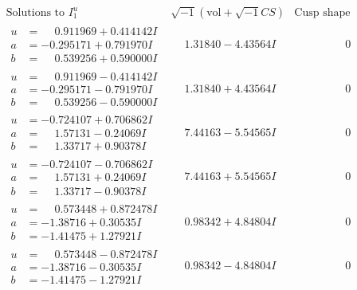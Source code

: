\documentclass[1p]{elsarticle_modified}
\theoremstyle{definition}
\newcommand{\I}{\sqrt{-1}}
\begin{document}
$$\begin{array}{c|c|c}  
\text{Solutions to }I^u_{1}& \I (\text{vol} + \sqrt{-1}CS) & \text{Cusp shape}\\
 \hline 
\begin{aligned}
u &= \phantom{-}0.911969 + 0.414142 I \\
a &= -0.295171 + 0.791970 I \\
b &= \phantom{-}0.539256 + 0.590000 I\end{aligned}
 & \phantom{-}1.31840 - 4.43564 I & \phantom{-0.000000 } 0 \\ \hline\begin{aligned}
u &= \phantom{-}0.911969 - 0.414142 I \\
a &= -0.295171 - 0.791970 I \\
b &= \phantom{-}0.539256 - 0.590000 I\end{aligned}
 & \phantom{-}1.31840 + 4.43564 I & \phantom{-0.000000 } 0 \\ \hline\begin{aligned}
u &= -0.724107 + 0.706862 I \\
a &= \phantom{-}1.57131 - 0.24069 I \\
b &= \phantom{-}1.33717 + 0.90378 I\end{aligned}
 & \phantom{-}7.44163 - 5.54565 I & \phantom{-0.000000 } 0 \\ \hline\begin{aligned}
u &= -0.724107 - 0.706862 I \\
a &= \phantom{-}1.57131 + 0.24069 I \\
b &= \phantom{-}1.33717 - 0.90378 I\end{aligned}
 & \phantom{-}7.44163 + 5.54565 I & \phantom{-0.000000 } 0 \\ \hline\begin{aligned}
u &= \phantom{-}0.573448 + 0.872478 I \\
a &= -1.38716 + 0.30535 I \\
b &= -1.41475 + 1.27921 I\end{aligned}
 & \phantom{-}0.98342 + 4.84804 I & \phantom{-0.000000 } 0 \\ \hline\begin{aligned}
u &= \phantom{-}0.573448 - 0.872478 I \\
a &= -1.38716 - 0.30535 I \\
b &= -1.41475 - 1.27921 I\end{aligned}
 & \phantom{-}0.98342 - 4.84804 I & \phantom{-0.000000 } 0 \\ \hline\begin{aligned}

\end{aligned}
\end{array}$$
\end{document}
